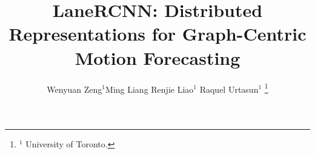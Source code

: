 \documentclass[letterpaper, 10 pt, conference]{ieeeconf}  %
\title{\LARGE \bf
LaneRCNN: Distributed Representations for Graph-Centric Motion Forecasting
}
\author{
  Wenyuan Zeng$^{1}$\quad Ming Liang \quad Renjie Liao$^{1}$ \quad
  Raquel Urtasun$^{1}$%
  \thanks{$^1$ University of Toronto.}
}
\begin{document}
\maketitle
\thispagestyle{empty}
\pagestyle{empty}


\begin{abstract}

\end{abstract}









% 











\end{document}
